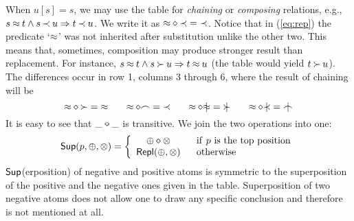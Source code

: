 When $u[s]=s$, we may use the table for {\em chaining} or {\em composing} relations,
e.g., $s\mathbin{\approx} t\land s\mathbin{\prec} u \mathrel\Rightarrow t\mathbin{\prec} u$. We write it as $\mathbin{\approx}\diamond\mathbin{\prec} = \mathbin{\prec}$.
Notice that in (\ref{eq:rep}) the predicate `$\mathbin{\approx}$' was not inherited after substitution
unlike the other two. This means that, sometimes, composition may produce
stronger result than replacement.
For instance, \(s\mathbin{\approx} t\land s\mathbin{\succ} u\mathrel\Rightarrow t\mathbin{\approx} u\)
(the table would yield $t\mathbin{\succ} u$).
The differences occur in row 1, columns 3 through 6, where the result of chaining will be
\begin{equation}\label{eq:chain}
\Comp\Eq{\Cont}=\Eq\ \ \ \ \ 
\Comp\Eq\Int =\Incl\ \ \ \ \ 
\Comp\Eq\notEq =\notCont\ \ \ \ \ 
\Comp\Eq\notIncl=\notInt 
\end{equation}
\noindent
It is easy to see that $\_\diamond\_$ is transitive.
We join the two operations into one: %
 \[\mbox {\sf Sup}(p ,\oplus ,\otimes) = \left \{ \begin{array}{cl}
 \oplus\diamond\otimes & {\ \ \rm if}\ p\ {\rm is\ the\ top\ position} \\
 \mbox {\sf Repl}(\oplus,\otimes) & {\ \ \rm otherwise} \end{array} \right . \]
$\mbox {\sf Sup}$(erposition) of negative and positive atoms is symmetric to the superposition of
the positive and the negative ones given in the table. Superposition of two
negative atoms does not allow one to draw any specific conclusion and
therefore is not mentioned at all.
%
%
